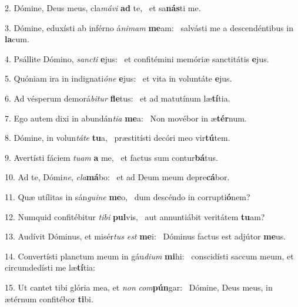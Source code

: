 2. Dómine, Deus meus, cla\textit{má}\textit{vi} \textbf{ad} te, \ast\  et sa\textbf{nás}ti me.\

3. Dómine, eduxísti ab inférno á\textit{ni}\textit{mam} \textbf{me}am: \ast\  salvásti me a descendéntibus in \textbf{la}cum.\

4. Psállite Dómino, \textit{sanc}\textit{ti} \textbf{e}jus: \ast\  et confitémini memóriæ sanctitátis \textbf{e}jus.\

5. Quóniam ira in indignati\textit{ó}\textit{ne} \textbf{e}jus: \ast\  et vita in voluntáte \textbf{e}jus.\

6. Ad vésperum demorá\textit{bi}\textit{tur} \textbf{fle}tus: \ast\  et ad matutínum læ\textbf{tí}tia.\

7. Ego autem dixi in abundán\textit{ti}\textit{a} \textbf{me}a: \ast\  Non movébor in æ\textbf{tér}num.\

8. Dómine, in volun\textit{tá}\textit{te} \textbf{tu}a, \ast\  præstitísti decóri meo vir\textbf{tú}tem.\

9. Avertísti fáciem \textit{tu}\textit{am} \textbf{a} me, \ast\  et factus sum contur\textbf{bá}tus.\

10. Ad te, Dómi\textit{ne}, \textit{cla}\textbf{má}bo: \ast\  et ad Deum meum depre\textbf{cá}bor.\

11. Quæ utílitas in sán\textit{gui}\textit{ne} \textbf{me}o, \ast\  dum descéndo in corrupti\textbf{ó}nem?\

12. Numquid confitébitur \textit{ti}\textit{bi} \textbf{pul}vis, \ast\  aut annuntiábit veritátem \textbf{tu}am?\

13. Audívit Dóminus, et misér\textit{tus} \textit{est} \textbf{me}i: \ast\  Dóminus factus est adjútor \textbf{me}us.\

14. Convertísti planctum meum in gáu\textit{di}\textit{um} \textbf{mi}hi: \ast\  conscidísti saccum meum, et circumdedísti me læ\textbf{tí}tia:\

15. Ut cantet tibi glória mea, et \textit{non} \textit{com}\textbf{pún}gar: \ast\  Dómine, Deus meus, in ætérnum confitébor \textbf{ti}bi.\

